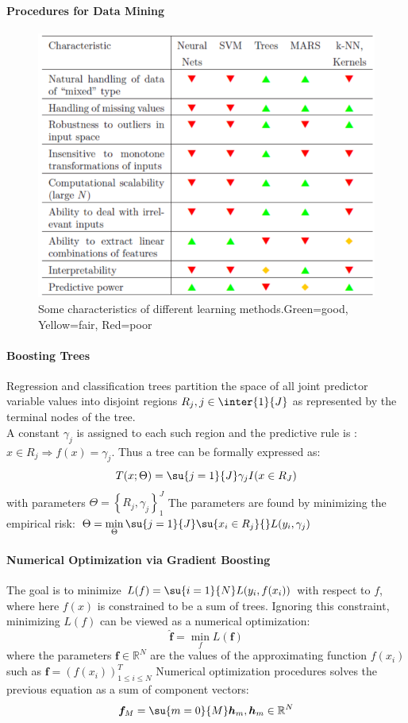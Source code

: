 \paragraph{Procedures for Data Mining}
\begin{figure}[H]
	\begin{center}
		\includegraphics[width=\textwidth]{./chap/1chap/7sec/images/4_compMeth.PNG}
	\end{center}
	\caption{Some characteristics of different learning methods.Green=good, Yellow=fair, 
	Red=poor}
	\label{fig:4_compMeth}
\end{figure}

\paragraph{Boosting Trees}
Regression and classification trees partition the space of all joint predictor variable values
into disjoint regions $R_{j},j\in\inter{1}{J}$ as represented by the terminal nodes of the tree.\\
A constant $\gamma_{j}$ is assigned to each such region and the predictive rule is :
$x\in R_{j} \Rightarrow f(x)=\gamma_{j}$. Thus a tree can be formally expressed as:
$$ T(x;\Theta)=\su{{j=1}}{J}\gamma_{j}I(x\in R_{J})$$
with parameters $\Theta=\left\{R_{j},\gamma_{j}\right\}_{1}^{J}$
The parameters are found by minimizing the empirical risk: 
$\Theta = \min\limits_{\Theta}\su{{j=1}}{J}\su{{x_{i}\in R_{j}}}{}L(y_{i},\gamma_{j})$

\paragraph{Numerical Optimization via Gradient Boosting}
The goal is to minimize $L(f)=\su{{i=1}}{N}L(y_{i},f(x_{i}))$ with respect to $f$, where here
$f(x)$ is constrained to be a sum of trees. Ignoring this constraint, minimizing $L(f)$ can be
viewed as a numerical optimization:
$$ \hat{\bm{f}} = \min\limits_{f}L(\bm{f})$$ where the parameters $\bm{f}\in\mathbb{R}^{N}$ are
the values of the approximating function $f(x_{i})$ such as $\bm{f} = \left(f(x_{i})
\right)_{1\leq i\leq N}^{T}$
Numerical optimization procedures solves the previous equation as a sum of component vectors:
$$ \bm{f}_{M} = \su{{m=0}}{M}\bm{h}_{m}, \bm{h}_{m}\in\mathbb{R}^{N}$$

